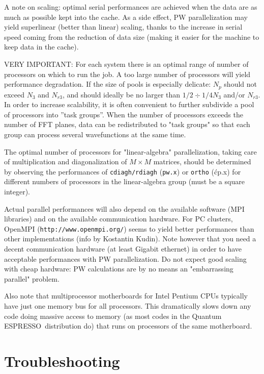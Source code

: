 \documentclass[12pt,a4paper]{article}
\def\qe{{\sc Quantum ESPRESSO}}
\def\pw.x{\texttt{pw.x}}
\begin{document}
A note on scaling: optimal serial performances are achieved when the data are
as much as possible kept into the cache. As a side effect, PW
parallelization may yield superlinear (better than linear) scaling,
thanks to the increase in serial speed coming from the reduction of data size 
(making it easier for the machine to keep data in the cache).

VERY IMPORTANT: For each system there is an optimal range of number of processors on which to 
run the job.  A too large number of processors will yield performance 
degradation. If the size of pools is especially delicate: $N_p$ should not 
exceed $N_3$ and $N_{r3}$, and should ideally be no larger than
$1/2\div1/4 N_3$ and/or $N_{r3}$. In order to increase scalability,
it is often convenient to 
further subdivide a pool of processors into ''task groups''.
When the number of processors exceeds the number of FFT planes, 
data can be redistributed to "task groups" so that each group 
can process several wavefunctions at the same time.

The optimal number of processors for "linear-algebra"
parallelization, taking care of multiplication and diagonalization 
of $M\times M$ matrices, should be determined by observing the
performances of \texttt{cdiagh/rdiagh} (\pw.x) or \texttt{ortho} (\'cp.x)
for different numbers of processors in the linear-algebra group
(must be a square integer).

Actual parallel performances will also depend on the available software 
(MPI libraries) and on the available communication hardware. For
PC clusters, OpenMPI (\texttt{http://www.openmpi.org/}) seems to yield better 
performances than other implementations (info by Kostantin Kudin). 
Note however that you need a decent communication hardware (at least 
Gigabit ethernet) in order to have acceptable performances with 
PW parallelization. Do not expect good scaling with cheap hardware: 
PW calculations are by no means an "embarrassing parallel" problem.
   
Also note that multiprocessor motherboards for Intel Pentium CPUs typically 
have just one memory bus for all processors. This dramatically
slows down any code doing massive access to memory (as most codes 
in the \qe\ distribution do) that runs on processors of the same
motherboard.

\section{Troubleshooting}
\end{document}
